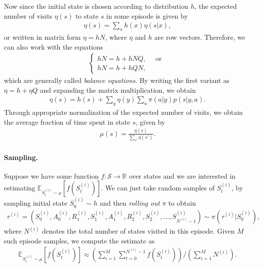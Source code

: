 \documentclass[a4paper]{report}
\theoremstyle{definition}
\theoremstyle{plain}
\begin{document}
%
Now since the initial state is chosen according to distribution $h$, the
expected number of visits $\eta(s)$ to state $s$ in some episode is given by
\begin{align*}
  \eta(s) = \sum_{x} h(x) \eta(s | x) ,
\end{align*}
or written in matrix form $\eta = hN$, where $\eta$ and $h$ are row vectors.
%
Therefore, we can also work with the equations
\begin{align*}
  \begin{cases}
  hN = h + hNQ , \quad \text{ or } \\
  hN = h + hQN ,
  \end{cases}
\end{align*}
which are generally called \textit{balance equations}.
By writing the first variant as $\eta = h + \eta Q$ and expanding the matrix
multiplication, we obtain
\begin{align*}
  \eta(s) = h(s) + \sum_{y} \eta(y) \sum_{a} \pi(a|y)p(s|y,a) .
\end{align*}
%
Through appropriate normalization of the expected number of visits, we obtain
the average fraction of time spent in state $s$, given by
\begin{align*}
  \mu(s) = \frac{\eta(s)}{\sum_{s'} \eta(s')} .
\end{align*}

\paragraph{Sampling.}

Suppose we have some function $f : \mathcal{S} \rightarrow \mathbb{R}$ over
states and we are interested in estimating $\mathbb{E}_{S_{t}^{(i)} \sim \mu}[f(S_{t}^{(i)})]$.
%
We can just take random samples of $S_{t}^{(i)}$, by sampling initial state
$S_{0}^{(i)} \sim h$ and then \textit{rolling out} $\pi$ to obtain
\begin{align*}
\tau^{(i)} = (S_{0}^{(i)},A_{0}^{(i)},R_{1}^{(i)},S_{1}^{(i)},A_{1}^{(i)},R_{2}^{(i)},S_{2}^{(i)}, \dots, S_{N^{(i)}-1}^{(i)}) \sim \pi(\tau^{(i)} | S_{0}^{(i)}),
\end{align*}
where $N^{(i)}$ denotes the total number of states visited in this episode.
%
Given $M$ such episode samples, we compute the estimate as
\begin{align*}
  \mathbb{E}_{S_{t}^{(i)} \sim \mu} [ f(S_{t}^{(i)}) ] \approx \left( \sum_{i=1}^{M} \sum_{t=0}^{N^{(i)} - 1} f(S_{t}^{(i)}) \right) / \left( \sum_{i=1}^{M} N^{(i)} \right) .
\end{align*}
\end{document}

